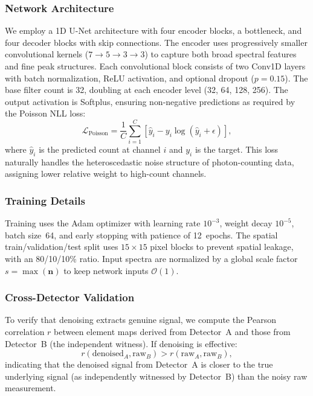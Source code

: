 \documentclass[twocolumn,11pt]{article}
\begin{document}
\subsubsection{Network Architecture}

We employ a 1D U-Net architecture with four encoder blocks, a bottleneck,
and four decoder blocks with skip connections. The encoder uses progressively
smaller convolutional kernels ($7 \to 5 \to 3 \to 3$) to capture both broad
spectral features and fine peak structures. Each convolutional block consists
of two Conv1D layers with batch normalization, ReLU activation, and optional
dropout ($p = 0.15$). The base filter count is 32, doubling at each encoder
level (32, 64, 128, 256). The output activation is Softplus, ensuring
non-negative predictions as required by the Poisson NLL loss:
\begin{equation}
  \mathcal{L}_{\text{Poisson}} =
  \frac{1}{C}\sum_{i=1}^{C}\left[\hat{y}_i - y_i \log(\hat{y}_i + \epsilon)\right],
  \label{eq:poisson_nll}
\end{equation}
where $\hat{y}_i$ is the predicted count at channel $i$ and $y_i$ is the
target. This loss naturally handles the heteroscedastic noise structure of
photon-counting data, assigning lower relative weight to high-count channels.

\subsubsection{Training Details}

Training uses the Adam optimizer with learning rate $10^{-3}$, weight decay
$10^{-5}$, batch size~64, and early stopping with patience of 12~epochs. The
spatial train/validation/test split uses $15 \times 15$ pixel blocks to
prevent spatial leakage, with an 80/10/10\% ratio. Input spectra are
normalized by a global scale factor $s = \max(\mathbf{n})$ to keep network
inputs $\mathcal{O}(1)$.

\subsubsection{Cross-Detector Validation}
\label{sec:cross_val}

To verify that denoising extracts genuine signal, we compute the Pearson
correlation $r$ between element maps derived from Detector~A and those from
Detector~B (the independent witness). If denoising is effective:
\begin{equation}
  r(\text{denoised}_A, \text{raw}_B) > r(\text{raw}_A, \text{raw}_B),
\end{equation}
indicating that the denoised signal from Detector~A is closer to the true
underlying signal (as independently witnessed by Detector~B) than the noisy
raw measurement.
\end{document}
